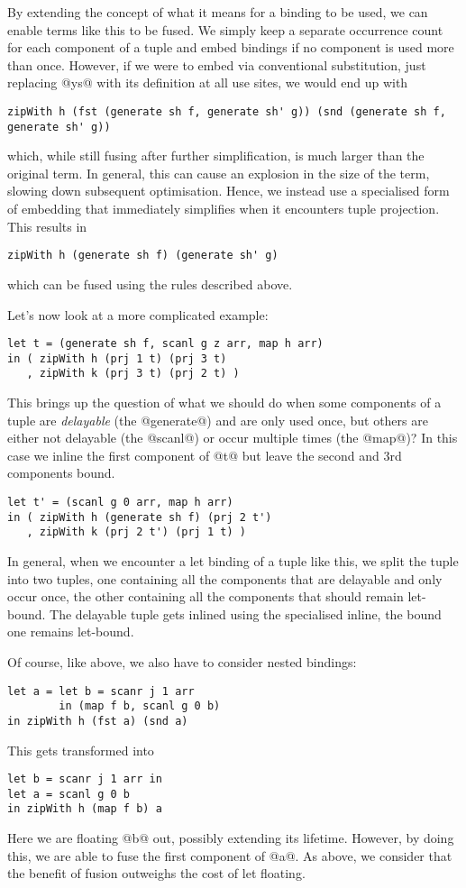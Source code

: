 By extending the concept of what it means for a binding to be used, we can enable terms like this to be fused. We simply keep a separate occurrence count for each component of a tuple and embed bindings if no component is used more than once. However, if we were to embed via conventional substitution, just replacing @ys@ with its definition at all use sites, we would end up with
%
\begin{lstlisting}
zipWith h (fst (generate sh f, generate sh' g)) (snd (generate sh f, generate sh' g))
\end{lstlisting}
%
which, while still fusing after further simplification, is much larger than the original term. In general, this can cause an explosion in the size of the term, slowing down subsequent optimisation. Hence, we instead use a specialised form of embedding that immediately simplifies when it encounters tuple projection. This results in
%
\begin{lstlisting}
zipWith h (generate sh f) (generate sh' g)
\end{lstlisting}
%
which can be fused using the rules described above.

Let's now look at a more complicated example:
%
\begin{lstlisting}
let t = (generate sh f, scanl g z arr, map h arr)
in ( zipWith h (prj 1 t) (prj 3 t)
   , zipWith k (prj 3 t) (prj 2 t) )
\end{lstlisting}
%
This brings up the question of what we should do when some components of a tuple are \emph{delayable} (the @generate@) and are only used once, but others are either not delayable (the @scanl@) or occur multiple times (the @map@)? In this case we inline the first component of @t@ but leave the second and 3rd components bound.
%
\begin{lstlisting}
let t' = (scanl g 0 arr, map h arr)
in ( zipWith h (generate sh f) (prj 2 t')
   , zipWith k (prj 2 t') (prj 1 t) )
\end{lstlisting}
%
In general, when we encounter a let binding of a tuple like this, we split the tuple into two tuples, one containing all the components that are delayable and only occur once, the other containing all the components that should remain let-bound. The delayable tuple gets inlined using the specialised inline, the bound one remains let-bound.

Of course, like above, we also have to consider nested bindings:
%
\begin{lstlisting}
let a = let b = scanr j 1 arr
        in (map f b, scanl g 0 b)
in zipWith h (fst a) (snd a)
\end{lstlisting}
%
This gets transformed into
%
\begin{lstlisting}
let b = scanr j 1 arr in
let a = scanl g 0 b
in zipWith h (map f b) a
\end{lstlisting}
%
Here we are floating @b@ out, possibly extending its lifetime. However, by doing this, we are able to fuse the first component of @a@. As above, we consider that the benefit of fusion outweighs the cost of let floating.


